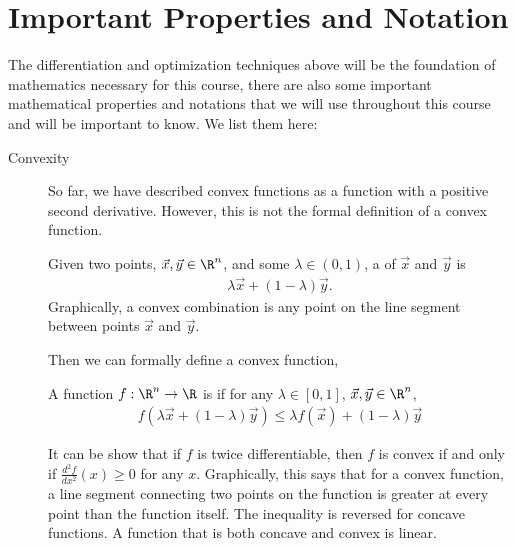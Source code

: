 \section{Important Properties and Notation}
The differentiation and optimization techniques above will be the foundation of mathematics necessary for this course, there are also some important mathematical properties and notations that we will use throughout this course and will be important to know. We list them here:
\begin{description}
    \item[Convexity] \label{def:convexity} So far, we have described convex functions as a function with a positive second derivative. However, this is not the formal definition of a convex function. 
    
    \begin{definition*}
        Given two points, $\vec{x}, \vec{y} \in \R^n$, and some $\lambda \in (0, 1)$, a  of $\vec{x}$ and $\vec{y}$ is 
        \begin{align*}
            \lambda \vec{x} + (1 - \lambda) \vec{y}.
        \end{align*}
        Graphically, a convex combination is any point on the line segment between points $\vec{x}$ and $\vec{y}$. 

    \end{definition*}
    
    Then we can formally define a convex function, 
    \begin{definition*} 
        A function $f: \R^n \to \R$ is  if for any $\lambda \in [0, 1]$, $\vec{x}, \vec{y} \in \R^n$,
        \begin{align*}
            f(\lambda \vec{x} + (1 - \lambda) \vec{y}) \leq \lambda f(\vec{x}) + (1 - \lambda) \vec{y}
        \end{align*}
    \end{definition*}

    It can be show that if $f$ is twice differentiable, then $f$ is convex if and only if $\frac{d^2f}{dx^2}(x) \geq 0$ for any $x$. Graphically, this says that for a convex function, a line segment connecting two points on the function is greater at every point than the function itself. The inequality is reversed for concave functions. A function that is both concave and convex is linear.


\end{description}

